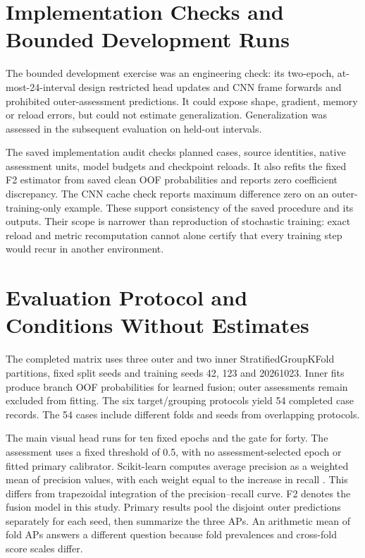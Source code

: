 \section{Implementation Checks and Bounded Development Runs}
The bounded development exercise was an engineering check: its two-epoch,
at-most-24-interval design restricted head updates and CNN frame forwards and prohibited
outer-assessment predictions. It could expose shape, gradient, memory or reload errors,
but could not estimate generalization. Generalization was assessed in the subsequent
evaluation on held-out intervals.

The saved implementation audit checks planned cases, source identities, native
assessment units, model budgets and checkpoint reloads. It also refits the fixed F2
estimator from saved clean OOF probabilities and reports zero coefficient discrepancy.
The CNN cache check reports maximum difference zero on an outer-training-only example.
These support consistency of the saved procedure and its outputs. Their scope is
narrower than reproduction of stochastic training: exact reload and metric recomputation
cannot alone certify that every training step would recur in another environment.

\section{Evaluation Protocol and Conditions Without Estimates}
The completed matrix uses three outer and two inner StratifiedGroupKFold partitions,
fixed split seeds and training seeds 42, 123 and 20261023. Inner fits produce branch OOF
probabilities for learned fusion; outer assessments remain excluded from fitting. The
six target/grouping protocols yield 54 completed case records. The 54 cases include
different folds and seeds from overlapping protocols.

The main visual head runs for ten fixed epochs and the gate for forty. The assessment
uses a fixed threshold of 0.5, with no assessment-selected epoch or fitted primary
calibrator. Scikit-learn computes average precision as a weighted mean of precision
values, with each weight equal to the increase in recall
\citep{Pedregosa2011ScikitLearn}. This differs from trapezoidal integration of the
precision--recall curve. F2 denotes the fusion model in this study. Primary results pool
the disjoint outer predictions separately for each seed, then summarize the three APs.
An arithmetic mean of fold APs answers a different question because fold prevalences and
cross-fold score scales differ.

